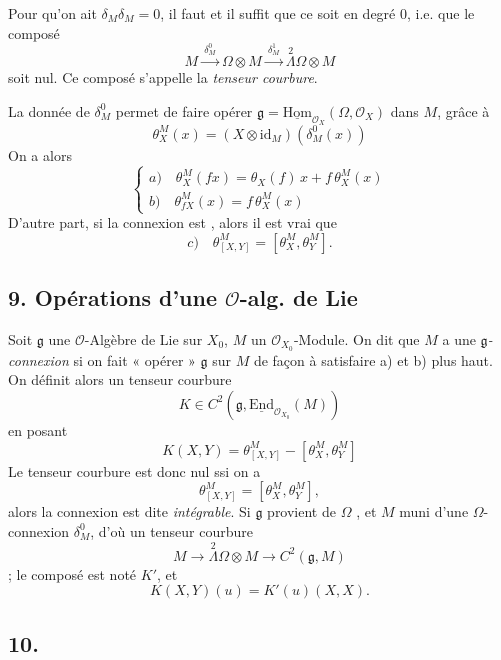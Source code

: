 \documentclass[11pt,a4paper]{article}
\begin{document}
Pour qu'on ait $\delta_M\delta_M = 0$, il faut et il suffit que ce soit
\struck{\ill{}} en degré 0, i.e. que le composé
\[
M \xrightarrow{\ \delta^0_M\ } \Omega \otimes M
\xrightarrow{\ \delta^1_M\ } \overset{2}{\Lambda}\Omega \otimes M
\]
soit nul. Ce composé s'appelle la \emph{tenseur courbure}.

La donnée de  $\delta^0_M$ permet de faire opérer
$\mathfrak{g} = \underline{\mathrm{Hom}}_{\mathcal{O}_X}(\Omega, \mathcal{O}_X)$
dans $M$, grâce à
\[
\theta^M_X(x) = (X \otimes \mathrm{id}_M)(\delta^0_M(x))
\]
On a alors
\[
\begin{cases}
a)\quad \theta^M_X(fx) = \theta_X(f)\,x + f\,\theta^M_X(x) \\
b)\quad \theta^M_{fX}(x) = f\,\theta^M_X(x)
\end{cases}
\]
D'autre part, si la connexion est 
, alors il est vrai que
\[
c)\quad \theta^M_{[X,Y]} = [\theta^M_X, \theta^M_Y] .
\]

\subsection*{9.  Opérations d'une $\mathcal{O}$-alg. de Lie}

Soit $\mathfrak{g}$ une $\mathcal{O}$-Algèbre de Lie sur $X_0$, $M$ un
$\mathcal{O}_{X_0}$-Module. On dit que $M$ a une \emph{$\mathfrak{g}$-connexion}
si on fait « opérer » $\mathfrak{g}$ sur $M$ de façon à satisfaire a) et b)
plus haut. On définit alors un tenseur courbure
\[
K \in C^2(\mathfrak{g}, \underline{\mathrm{End}}_{\mathcal{O}_{X_0}}(M))
\]
en posant
\[
K(X,Y) = \theta^M_{[X,Y]} - [\theta^M_X, \theta^M_Y]
\]
Le tenseur courbure est donc nul ssi on a
\[
\theta^M_{[X,Y]} = [\theta^M_X, \theta^M_Y] ,
\]
alors la connexion est dite \emph{intégrable}. Si $\mathfrak{g}$ provient
de $\Omega$ ,
et $M$  muni d'une $\Omega$-connexion $\delta^0_M$, d'où
un tenseur courbure
\[
M \longrightarrow \overset{2}{\Lambda}\Omega \otimes M \longrightarrow C^2(\mathfrak{g}, M)
\]
 ; le composé est noté $K'$, et
\[
K(X,Y)(u) = K'(u)(X,X) .
\]

\subsection*{10.}
\end{document}

